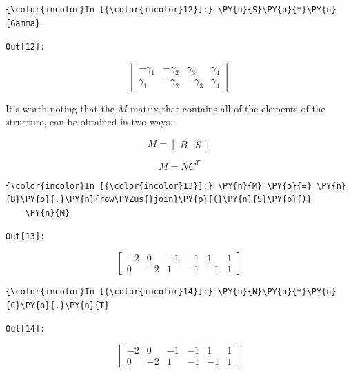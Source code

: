 \begin{Verbatim}[commandchars=\\\{\}]
    {\color{incolor}In [{\color{incolor}12}]:} \PY{n}{S}\PY{o}{*}\PY{n}{Gamma}
\end{Verbatim}
\texttt{\color{outcolor}Out[{\color{outcolor}12}]:}


\begin{equation*}
    \left[\begin{matrix}- \gamma_{1} & - \gamma_{2} & \gamma_{3} & \gamma_{4}\\\gamma_{1} & - \gamma_{2} & - \gamma_{3} & \gamma_{4}\end{matrix}\right]
\end{equation*}



It's worth noting that the \(M\) matrix that contains all of the
elements of the structure, can be obtained in two ways.

\[
M = \begin{bmatrix} B & S \end{bmatrix}
\]

\[
M = N C^T
\]

\begin{Verbatim}[commandchars=\\\{\}]
    {\color{incolor}In [{\color{incolor}13}]:} \PY{n}{M} \PY{o}{=} \PY{n}{B}\PY{o}{.}\PY{n}{row\PYZus{}join}\PY{p}{(}\PY{n}{S}\PY{p}{)}
    \PY{n}{M}
\end{Verbatim}
\texttt{\color{outcolor}Out[{\color{outcolor}13}]:}


\begin{equation*}
    \left[\begin{matrix}-2 & 0 & -1 & -1 & 1 & 1\\0 & -2 & 1 & -1 & -1 & 1\end{matrix}\right]
\end{equation*}



\begin{Verbatim}[commandchars=\\\{\}]
    {\color{incolor}In [{\color{incolor}14}]:} \PY{n}{N}\PY{o}{*}\PY{n}{C}\PY{o}{.}\PY{n}{T}
\end{Verbatim}
\texttt{\color{outcolor}Out[{\color{outcolor}14}]:}


\begin{equation*}
    \left[\begin{matrix}-2 & 0 & -1 & -1 & 1 & 1\\0 & -2 & 1 & -1 & -1 & 1\end{matrix}\right]
\end{equation*}



